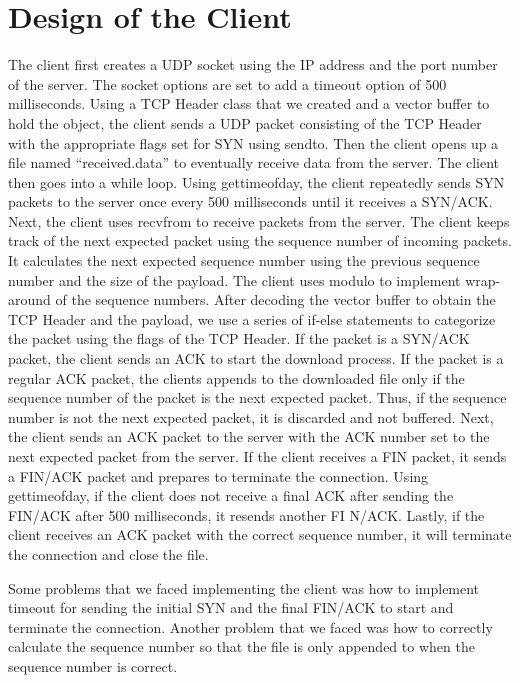 \documentclass{article}
\begin{document}
\section{Design of the Client}
    The client first creates a UDP socket using the IP address and the port
    number of the server. The socket options are set to add a timeout option of
    500 milliseconds. Using a TCP Header class that we created and a vector
    buffer to hold the object, the client sends a UDP packet consisting of the
    TCP Header with the appropriate flags set for SYN using sendto. Then the
    client opens up a file named “received.data” to eventually receive data
    from the server. The client then goes into a while loop. Using
    gettimeofday, the client repeatedly sends SYN packets to the server once
    every 500 milliseconds until it receives a SYN/ACK. Next, the client uses
    recvfrom to receive packets from the server. The client keeps track of the
    next expected packet using the sequence number of incoming packets. It
    calculates the next expected sequence number using the previous sequence
    number and the size of the payload. The client uses modulo to implement
    wrap-around of the sequence numbers. After decoding the vector buffer to
    obtain the TCP Header and the payload, we use a series of if-else
    statements to categorize the packet using the flags of the TCP Header. If
    the packet is a SYN/ACK packet, the client sends an ACK to start the
    download process. If the packet is a regular ACK packet, the clients
    appends to the downloaded file only if the sequence number of the packet is
    the next expected packet. Thus, if the sequence number is not the next
    expected packet, it is discarded and not buffered. Next, the client sends
    an ACK packet to the server with the ACK number set to the next expected
    packet from the server. If the client receives a FIN packet, it sends a
    FIN/ACK packet and prepares to terminate the connection. Using
    gettimeofday, if the client does not receive a final ACK after sending the
    FIN/ACK after 500 milliseconds, it resends another FI N/ACK. Lastly, if the
    client receives an ACK packet with the correct sequence number, it will
    terminate the connection and close the file.
    
    Some problems that we faced implementing the client was how to implement
    timeout for sending the initial SYN and the final FIN/ACK to start and
    terminate the connection. Another problem that we faced was how to
    correctly calculate the sequence number so that the file is only appended
    to when the sequence number is correct.
\end{document}
